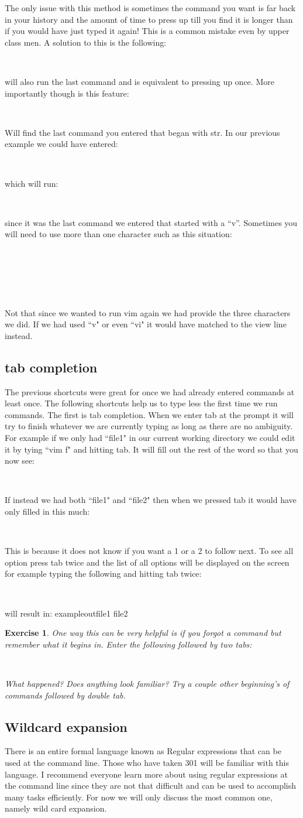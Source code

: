 \documentclass{book}
\newcommand{\commandline}[1]{\begin{center} \colorbox{Dark}{\textcolor{white}{#1}} \end{center}}
\newtheorem{ex}{Exercise}[chapter]
\begin{document}
The only issue with this method is sometimes the command you want is far back in your history and the amount of time to press up till you find it is longer than if you would have just typed it again! This is a common mistake even by upper class men. A solution to this is the following:
\commandline{!!}
will also run the last command and is equivalent to pressing up once. More importantly though is this feature:
\commandline{!str}
Will find the last command you entered that began with str. In our previous example we could have entered:
\commandline{!v}
which will run:
\commandline{vim HelloWorld.c}
since it was the last command we entered that started with a ``v''. Sometimes you will need to use more than one character such as this situation:
\commandline{vim HelloWorld.c}
\commandline{view HelloWorld.c}
\commandline{!vim}
Not that since we wanted to run vim again we had provide the three characters we did. If we had used ``v" or even ``vi" it would have matched to the view line instead.

\subsection{tab completion}
The previous shortcuts were great for once we had already entered commands at least once. The following shortcuts help us to type less the first time we run commands. The first is tab completion. When we enter tab at the prompt it will try to finish whatever we are currently typing as long as there are no ambiguity. For example if we only had ``file1" in our current working directory we could edit it by tying ``vim f" and hitting tab. It will fill out the rest of the word so that you now see:
\commandline{vim file1}
If instead we had both ``file1" and ``file2" then when we pressed tab it would have only filled in this much:
\commandline{vim file}
This is because it does not know if you want a 1 or a 2 to follow next. To see all option press tab twice and the list of all options will be displayed on the screen for example typing the following and hitting tab twice:
\commandline{vim f}
will result in:
exampleout{file1 file2}
\begin{ex}
One way this can be very helpful is if you forgot a command but remember what it begins in. Enter the following followed by two tabs:
\commandline{wh}
What happened? Does anything look familiar? Try a couple other beginning's of commands followed by double tab.
\end{ex}
\subsection{Wildcard expansion}
There is an entire formal language known as Regular expressions that can be used at the command line. Those who have taken 301 will be familiar with this language. I recommend everyone learn more about using regular expressions at the command line since they are not that difficult and can be used to accomplish many tasks efficiently. For now we will only discuss the most common one, namely wild card expansion.
\end{document}
